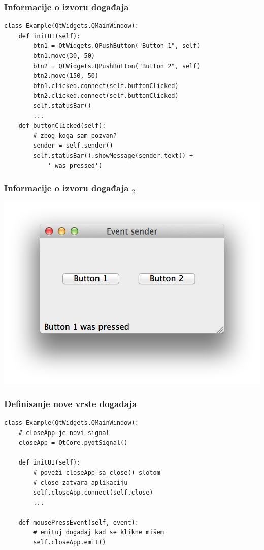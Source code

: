 \documentclass[utf8,compress,aspectratio=169]{beamer}
\begin{document}
\begin{frame}[fragile]
  \frametitle{Informacije o izvoru događaja}
\begin{verbatim}
class Example(QtWidgets.QMainWindow):
    def initUI(self):
        btn1 = QtWidgets.QPushButton("Button 1", self)
        btn1.move(30, 50)
        btn2 = QtWidgets.QPushButton("Button 2", self)
        btn2.move(150, 50)
        btn1.clicked.connect(self.buttonClicked)
        btn2.clicked.connect(self.buttonClicked)
        self.statusBar()
        ...
    def buttonClicked(self):
        # zbog koga sam pozvan?
        sender = self.sender()
        self.statusBar().showMessage(sender.text() +
            ' was pressed')
\end{verbatim}
\end{frame}

\begin{frame}[fragile]
  \frametitle{Informacije o izvoru događaja $_2$}
\begin{center}
\includegraphics[scale=0.5]{pyqt11.png}
\end{center}
\end{frame}

\begin{frame}[fragile]
  \frametitle{Definisanje nove vrste događaja}
\begin{verbatim}
class Example(QtWidgets.QMainWindow):
    # closeApp je novi signal
    closeApp = QtCore.pyqtSignal()

    def initUI(self):
        # poveži closeApp sa close() slotom
        # close zatvara aplikaciju
        self.closeApp.connect(self.close)
        ...

    def mousePressEvent(self, event):
        # emituj događaj kad se klikne mišem
        self.closeApp.emit()
\end{verbatim}
\end{frame}
\end{document}
